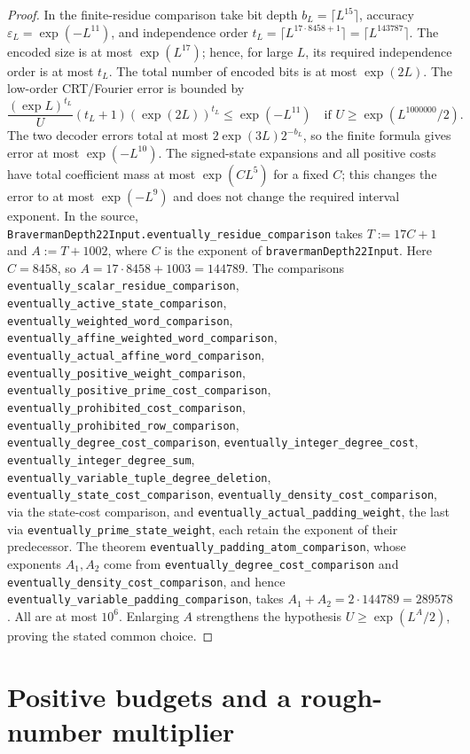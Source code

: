\documentclass[11pt]{article}
\theoremstyle{definition}
\newcommand{\leanname}[1]{\nolinkurl{#1}}
\begin{document}
\begin{proof}
In the finite-residue comparison take bit depth
$b_L=\lceil L^{15}\rceil$, accuracy $\varepsilon_L=\exp(-L^{11})$,
and independence order
$t_L=\lceil L^{17\cdot8458+1}\rceil=\lceil L^{143787}\rceil$.
The encoded size is at most $\exp(L^{17})$; hence, for large $L$,
its required independence order is at most $t_L$.
The total number of encoded bits is at most $\exp(2L)$.
The low-order CRT/Fourier error is bounded by
\[
 \frac{(\exp L)^{t_L}}{U}(t_L+1)(\exp(2L))^{t_L}
 \le\exp(-L^{11})
 \quad\text{if }U\ge\exp(L^{1000000}/2).
\]
The two decoder errors total at most
$2\exp(3L)2^{-b_L}$, so the finite formula gives error at most
$\exp(-L^{10})$.
The signed-state expansions and all positive costs have total
coefficient mass at most $\exp(C L^5)$ for a fixed $C$; this changes the
error to at most $\exp(-L^9)$ and does not change the required interval
exponent. In the source,
\leanname{BravermanDepth22Input.eventually_residue_comparison} takes
$T:=17C+1$ and $A:=T+1002$, where $C$ is the exponent of
\leanname{bravermanDepth22Input}. Here $C=8458$, so
$A=17\cdot8458+1003=144789$.
The comparisons
\leanname{eventually_scalar_residue_comparison},
\leanname{eventually_active_state_comparison},
\leanname{eventually_weighted_word_comparison},
\leanname{eventually_affine_weighted_word_comparison},
\leanname{eventually_actual_affine_word_comparison},
\leanname{eventually_positive_weight_comparison},
\leanname{eventually_positive_prime_cost_comparison},
\leanname{eventually_prohibited_cost_comparison},
\leanname{eventually_prohibited_row_comparison},
\leanname{eventually_degree_cost_comparison},
\leanname{eventually_integer_degree_cost},
\leanname{eventually_integer_degree_sum},
\leanname{eventually_variable_tuple_degree_deletion},
\leanname{eventually_state_cost_comparison},
\leanname{eventually_density_cost_comparison}, via the state-cost comparison,
and \leanname{eventually_actual_padding_weight}, the last via
\leanname{eventually_prime_state_weight}, each retain the exponent of
their predecessor. The theorem
\leanname{eventually_padding_atom_comparison}, whose exponents $A_1,A_2$
come from \leanname{eventually_degree_cost_comparison} and
\leanname{eventually_density_cost_comparison}, and hence
\leanname{eventually_variable_padding_comparison}, takes
$A_1+A_2=2\cdot144789=289578$.
All are at most $10^6$. Enlarging $A$ strengthens the hypothesis
$U\ge\exp(L^A/2)$, proving the stated common choice.
\end{proof}

\section{Positive budgets and a rough-number multiplier}
\end{document}
